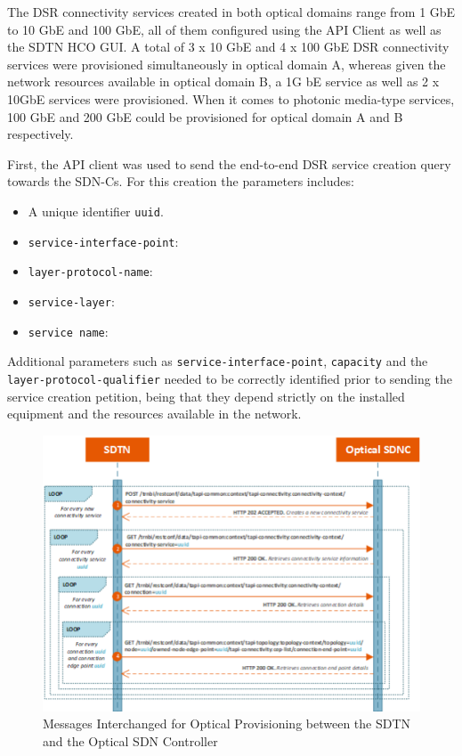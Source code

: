 \documentclass[a4paper,fleqn]{cas-dc}
\begin{document}
The DSR connectivity services created in both optical domains range from 1 GbE to 10 GbE and 100 GbE, all of them configured using the API Client as well as the SDTN HCO GUI. A total of 3 x 10 GbE and 4 x 100 GbE DSR connectivity services were provisioned simultaneously  in optical domain A, whereas given the network resources available in optical domain B, a 1G bE service as well as 2 x 10GbE services were provisioned. When it comes to photonic media-type services, 100 GbE and 200 GbE could be provisioned for optical domain A and B respectively. 

First, the API client was used to send the end-to-end DSR service creation query towards the SDN-Cs. For this creation the parameters includes: 
\begin{itemize}
    \item A unique identifier \texttt{uuid}.
    \item \texttt{service-interface-point}:
    \item \texttt{layer-protocol-name}:
    \item \texttt{service-layer}:
    \item \texttt{service name}:
\end{itemize}

Additional parameters such as \texttt{service-interface-point}, \texttt{capacity} and the \texttt{layer-protocol-qualifier} needed to be correctly identified prior to sending the service creation petition, being that they depend strictly on the installed equipment and the resources available in the network.

\begin{figure}
	\centering
		\includegraphics[width=\linewidth]{figs/optical_provisioning_workflow_2.png}
	\caption{Messages Interchanged for Optical Provisioning between the SDTN and the Optical SDN Controller}
	\label{FIG:optical_provisioning_workflow}
\end{figure}
\end{document}
